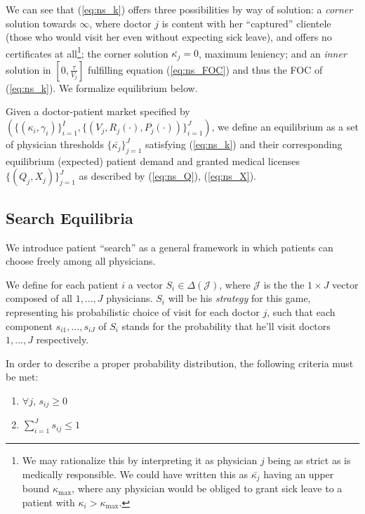 \documentclass{article}
\begin{document}
We can see that (\ref{eq:ns_k}) offers three possibilities by way of solution: a \textit{corner} solution towards $\infty$, where doctor $j$ is content with her ``captured'' clientele (those who would visit her even without expecting sick leave), and offers no certificates at all\footnote{We may rationalize this by interpreting it as physician $j$ being as strict as is medically responsible. We could have written this as $\bar{\kappa_j}$ having an upper bound $\kappa_{\operatorname{max}}$, where any physician would be obliged to grant sick leave to a patient with $\kappa_i > \kappa_{\operatorname{max}}$.}; the corner solution $\bar{\kappa_j} = 0$, maximum leniency; and an \textit{inner} solution in $[0,\frac{\tau}{V_j}]$ fulfilling equation (\ref{eq:ns_FOC}) and thus the FOC of (\ref{eq:ns_k}). We formalize equilibrium below.

\begin{equilibrium}
    \label{ns_eq}
Given a doctor-patient market specified by $(\{(\kappa_i,\gamma_i)\}_{i =1}^{I},\{(V_j,R_j(\cdot),P_j(\cdot))\}_{i =1}^{J})$, we define an equilibrium as a set of physician thresholds $\{\bar{\kappa_j}\}_{j =1}^{J}$ satisfying (\ref{eq:ns_k}) and their corresponding equilibrium (expected) patient demand and granted medical licenses $\{(Q_j,X_j)\}_{j =1}^{J}$ as described by (\ref{eq:ns_Q}), (\ref{eq:ns_X}).
\end{equilibrium}

\subsection{Search Equilibria}

We introduce patient ``search'' as a general framework in which patients can choose freely among all physicians.

We define for each patient $i$ a vector $S_i \in \Delta(\mathcal{J})$, where $\mathcal{J}$ is the the $1 \times J$ vector composed of all $1, ..., J$ physicians. $S_i$ will be his \textit{strategy} for this game, representing his probabilistic choice of visit for each doctor $j$, such that each component $s_{i1}, ... , s_{iJ}$ of $S_i$ stands for the probability that he’ll visit doctors $1, ..., J$ respectively.

In order to describe a proper probability distribution, the following criteria must be met:


\begin{enumerate}[label=\roman*.]
    \item $\forall j, \, s_{ij} \geq 0$
    \item $\sum_{i = 1}^{J} s_{ij} \leq 1$
\end{enumerate}
\end{document}
